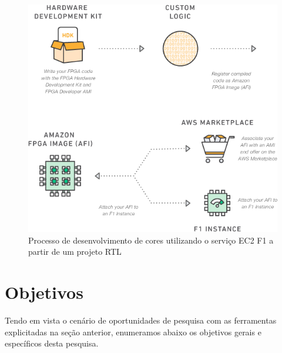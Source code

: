 \documentclass[conference]{IEEEtran}
\begin{document}
	\begin{figure}[htbp]
		\centerline{\includegraphics[scale=0.400]{fig3.png}}
		\caption{Processo de desenvolvimento de cores utilizando o serviço EC2 F1 a partir de um projeto RTL}
		\label{aws}
	\end{figure}
	
	\section{Objetivos}
	Tendo em vista o cenário de oportunidades de pesquisa com as ferramentas 
	explicitadas na seção anterior, enumeramos abaixo os objetivos
	gerais e específicos desta pesquisa.\\
	
\end{document}
